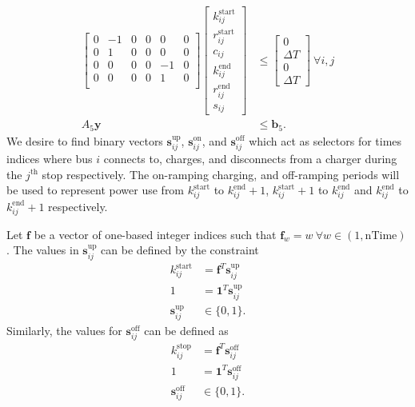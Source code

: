 \begin{equation} \begin{aligned}
	\begin{bmatrix} 0 & -1 & 0 & 0 &  0 & 0\\
			0 &  1 & 0 & 0 &  0 & 0\\
		        0 &  0 & 0 & 0 & -1 & 0\\
			0 &  0 & 0 & 0 &  1 & 0\\
	\end{bmatrix} 
	\begin{bmatrix} k_{ij}^{\text{start}} \\
		        r_{ij}^{\text{start}} \\
			c_{ij}                \\
			k_{ij}^{\text{end}}   \\
			r_{ij}^{\text{end}}   \\
			s_{ij}
	\end{bmatrix} &\le 
	\begin{bmatrix}  0\\
			\Delta T \\
			0 \\
			\Delta T
	\end{bmatrix} \ \forall i,j \\ 
	A_5\mathbf{y} &\le \mathbf{b}_5.  
\end{aligned} \end{equation}
We desire to find binary vectors $\mathbf{s}^{\text{up}}_{ij}$, $\mathbf{s}^{\text{on}}_{ij}$, and $\mathbf{s}^{\text{off}}_{ij}$ which act as selectors for times indices where bus $i$ connects to, charges, and disconnects from a charger during the $j^{\text{th}}$ stop respectively. The on-ramping charging, and off-ramping periods will be used to represent power use from $k^{\text{start}}_{ij}$ to $k^{\text{end}}_{ij} + 1$, $k^{\text{start}}_{ij} + 1$ to $k^{\text{end}}_{ij}$ and $k^{\text{end}}_{ij}$ to $k^{\text{end}}_{ij} + 1$ respectively. 
\par Let $\mathbf{f}$ be a vector of one-based integer indices such that $\mathbf{f}_w = w \ \forall w \in (1,\text{nTime})$. The values in $\mathbf{s}^{\text{up}}_{ij}$ can be defined by the constraint
\begin{equation}\label{eqn:idxStart}\begin{aligned}
	k^{\text{start}}_{ij} &= \mathbf{f}^T\mathbf{s}^{\text{up}}_{ij} \\
	1 &= \mathbf{1}^T\mathbf{s}^{\text{up}}_{ij} \\
	\mathbf{s}^{\text{up}}_{ij} &\in \{0,1\}.
\end{aligned} \end{equation}
Similarly, the values for $\mathbf{s}^{\text{off}}_{ij}$ can be defined as
\begin{equation} \label{eqn:idxEnd}\begin{aligned}
	k^{\text{stop}}_{ij} &= \mathbf{f}^T\mathbf{s}^{\text{off}}_{ij}\\ 
	1 &= \mathbf{1}^T\mathbf{s}^{\text{off}}_{ij} \\
	\mathbf{s}^{\text{off}}_{ij} &\in \{0,1\}.
\end{aligned} \end{equation}

